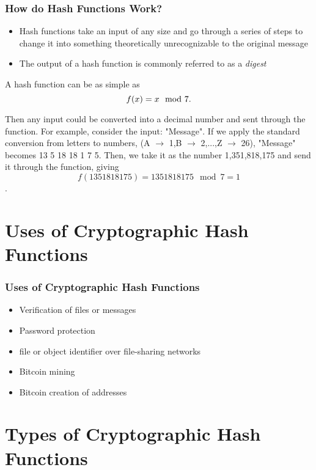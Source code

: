 \documentclass{beamer}
\begin{document}
\begin{frame}
\frametitle{How do Hash Functions Work?}
	\begin{itemize}
		\item Hash functions take an input of any size and go through a series of steps to change it into something theoretically unrecognizable to the original message
		\item The output of a hash function is commonly referred to as a \textit{digest}
	\end{itemize}
	\vspace{.1in}
	A hash function can be as simple as $$\vspace{.3in}f(x) = x\mod7.$$ \vspace{-.5in}
	
	Then any input could be converted into a decimal number and sent through the function. For example, consider the input: "Message". If we apply the standard conversion from letters to numbers, (A $\rightarrow$ 1,B $\rightarrow$ 2,...,Z $\rightarrow$ 26), "Message" becomes 13 5 18 18 1 7 5. Then, we take it as the number 1,351,818,175 and send it through the function, giving $$f(1351818175) = 1351818175 \mod 7 = 1$$.
\end{frame}

\section{Uses of Cryptographic Hash Functions}

\begin{frame}
\frametitle{Uses of Cryptographic Hash Functions}
	\begin{itemize}
		\item Verification of files or messages
		\item Password protection
		\item file or object identifier over file-sharing networks
		\item Bitcoin mining
		\item Bitcoin creation of addresses
		
	\end{itemize}
\end{frame}

\section{Types of Cryptographic Hash Functions}
\end{document}
